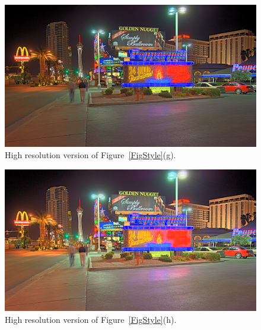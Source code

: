 \begin{figure}
\begin{center}
\includegraphics[width=\textwidth]{figures/chapter5/style_based/Peppermill_hdrcandy_w0_1.png}
\caption{High resolution version of Figure~\ref{FigStyle}(g).}
\end{center}
\end{figure}

\begin{figure}
\begin{center}
\includegraphics[width=\textwidth]{figures/chapter5/style_based/Peppermill_hdrcandy_w0_w1_w2.png}
\caption{High resolution version of Figure~\ref{FigStyle}(h).}
\end{center}
\end{figure}